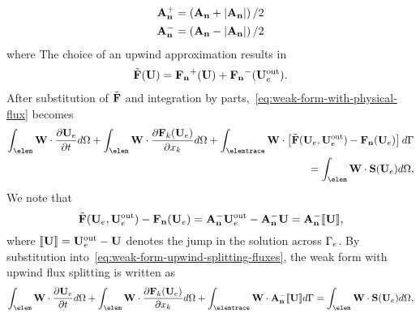 \begin{align}
  \label{eq:AnMinus-AnPlus-Definition}
\mathbf{A}_\mathbf{n}^{+} &= \left( \mathbf{A}_\mathbf{n} + \left| \mathbf{A}_\mathbf{n} \right| \right) / 2   \\
\mathbf{A}_\mathbf{n}^{-} &= \left( \mathbf{A}_\mathbf{n} - \left| \mathbf{A}_\mathbf{n} \right| \right) / 2
\end{align}
where %
The choice of an upwind approximation results in
\begin{align}
\tilde{\mathbf{F}}(\mathbf{U}) = \mathbf{\mathbf{F}_n}^+(\mathbf{U}) + \mathbf{\mathbf{F}_n}^-(\mathbf{U}_e^{\textrm{out}}).
\label{eq:num-flux-splitting}
\end{align}
After substitution of $\tilde{\mathbf{F}}$ and integration by parts,~\eqref{eq:weak-form-with-physical-flux} becomes
\begin{align*}
\int_{\elem} \TF \cdot \uet \delem  + \int_{\elem} \TF \cdot \dpart{\Flux_{k}(\Ue)}{\xk} \delem + \int_{\elemtrace} \TF \cdot \left[ \NumFlux(\Ue,\Uout) - \NormalFlux(\Ue) \right] \delemtrace \\
= \int_{\elem} \TF  \cdot \maxwellSource(\Ue) \delem, \label{eq:weak-form-upwind-splitting-fluxes}
\end{align*}
We note that %
\begin{equation}
  \tilde{\mathbf{F}}(\mathbf{U}_e,\mathbf{U}_e^{\textrm{out}}) - \mathbf{\mathbf{F}_n}(\mathbf{U}_e) = \mathbf{A}_\mathbf{n}^{-} \mathbf{U}_e^{\textrm{out}} - \mathbf{A}_\mathbf{n}^{-} \mathbf{U} = \mathbf{A}_\mathbf{n}^{-} \llbracket \mathbf{U} \rrbracket, \label{eq:AnMinusUderivation}
\end{equation}
where $\llbracket \mathbf{U} \rrbracket = \mathbf{U}_e^{\textrm{out}} - \mathbf{U}$ denotes the jump in the solution across $\Gamma_e$. By substitution into~\eqref{eq:weak-form-upwind-splitting-fluxes}, the weak form with upwind flux splitting is written as
\begin{equation}
\int_{\elem} \TF \cdot \uet \delem  + \int_{\elem} \TF \cdot \dpart{\Flux_{k}(\Ue)}{\xk} \delem + \int_{\elemtrace} \TF \cdot \AnMinusU \delemtrace = \int_{\elem} \TF  \cdot \maxwellSource(\Ue) \delem,
\label{eq:weak-form-final}
\end{equation}


